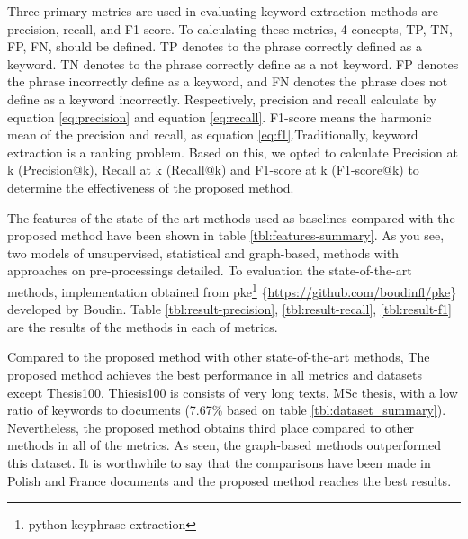 \documentclass[3p]{elsarticle}
\begin{document}
Three primary metrics are used in evaluating keyword extraction methods are precision, recall, and F1-score. To calculating these metrics, 4 concepts, TP, TN, FP, FN, should be defined. TP denotes to the phrase correctly defined as a keyword. TN denotes to the phrase correctly define as a not keyword. FP denotes the phrase incorrectly define as a keyword, and FN denotes the phrase does not define as a keyword incorrectly. Respectively, precision and recall calculate by equation \ref{eq:precision} and equation \ref{eq:recall}. F1-score means the harmonic mean of the precision and recall, as equation \ref{eq:f1}.Traditionally, keyword extraction is a ranking problem. Based on this, we opted to calculate Precision at k (Precision@k), Recall at k (Recall@k) and F1-score at k (F1-score@k) to determine the effectiveness of the proposed method.











The features of the state-of-the-art methods used as baselines compared with the proposed method have been shown in table \ref{tbl:features-summary}. As you see, two models of unsupervised, statistical and graph-based, methods with approaches on pre-processings detailed. To evaluation the state-of-the-art methods, implementation obtained from pke\footnote{python keyphrase extraction} \{\url{https://github.com/boudinfl/pke}\} developed by Boudin. Table \ref{tbl:result-precision}, \ref{tbl:result-recall}, \ref{tbl:result-f1} are the results of the methods in each of metrics.

Compared to the proposed method with other state-of-the-art methods, The proposed method achieves the best performance in all metrics and datasets except Thesis100. Thiesis100 is consists of very long texts, MSc thesis, with a low ratio of keywords to documents (7.67\% based on table \ref{tbl:dataset_summary}). Nevertheless, the proposed method obtains third place compared to other methods in all of the metrics. As seen, the graph-based methods outperformed this dataset. It is worthwhile to say that the comparisons have been made in Polish and France documents and the proposed method reaches the best results.
\end{document}
